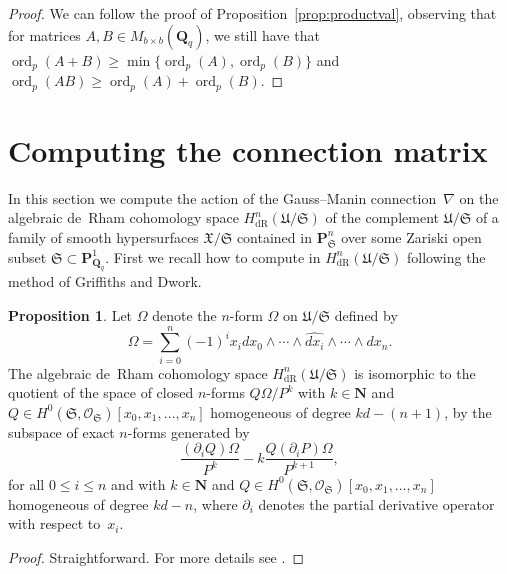 \documentclass[a4paper,11pt]{article}
\numberwithin{equation}{section}
\newcommand{\NN}{\mathbf{N}} %
\newcommand{\QQ}{\mathbf{Q}} %
\DeclareMathOperator{\ord}{ord}          %
\providecommand{\HdR}{H_{\text{dR}}}    %
\theoremstyle{definition}
\newtheorem{prop}[thm]{Proposition}
\begin{document}
\begin{proof}
We can follow the proof of Proposition~\ref{prop:productval}, 
observing that for matrices $A,B \in M_{b \times b}(\QQ_q)$, we still have that
$\ord_p(A + B) \geq \min \{\ord_p(A), \ord_p(B)\}$ and $\ord_p(AB) \geq \ord_p(A)+\ord_p(B)$.
\end{proof}

\section{Computing the connection matrix}
\label{sec:Connection}

In this section we compute the action of the Gauss--Manin connection~$\nabla$ on 
the algebraic de~Rham cohomology space $\HdR^{n}(\mathfrak{U}/\mathfrak{S})$ of the 
complement $\mathfrak{U}/\mathfrak{S}$ of a family of smooth hypersurfaces 
$\mathfrak{X}/\mathfrak{S}$ contained in $\mathbf{P}^n_{\mathfrak{S}}$ over
some Zariski open subset $\mathfrak{S} \subset \mathbf{P}^1_{\QQ_q}$.
First we recall how to compute in $\HdR^{n}(\mathfrak{U}/\mathfrak{S})$ 
following the method of Griffiths and Dwork.  

\begin{prop}
Let $\Omega$ denote the $n$-form $\Omega$ on $\mathfrak{U}/\mathfrak{S}$ 
defined by 
\begin{equation*}
\Omega = \sum_{i=0}^n (-1)^i x_i d x_0 \wedge \dotsb \wedge \widehat{d x_i} \wedge \dotsb \wedge d x_n.
\end{equation*}
The algebraic de~Rham cohomology space $\HdR^{n}(\mathfrak{U}/\mathfrak{S})$ is 
isomorphic to the quotient of the space of closed $n$-forms 
$Q \Omega / P^k$ with $k \in \NN$ and $Q \in H^0(\mathfrak{S},\mathcal{O}_{\mathfrak{S}})[x_0, x_1, \dotsc, x_n]$ 
homogeneous of degree $k d - (n + 1)$, by the subspace of exact $n$-forms generated by
\begin{equation*} 
\frac{(\partial_i Q) \Omega}{P^k} - k \frac{Q (\partial_i P) \Omega}{P^{k+1}},
\end{equation*}
for all $0 \leq i \leq n$ and with $k \in \NN$ and $Q \in H^0(\mathfrak{S},\mathcal{O}_{\mathfrak{S}})[x_0, x_1, \dotsc, x_n]$ 
homogeneous of degree $kd-n$, where $\partial_i$ denotes the partial derivative operator with respect to~$x_i$.
\end{prop}

\begin{proof}
Straightforward. For more details see \cite{Griffiths1969}.
\end{proof}
\end{document}
